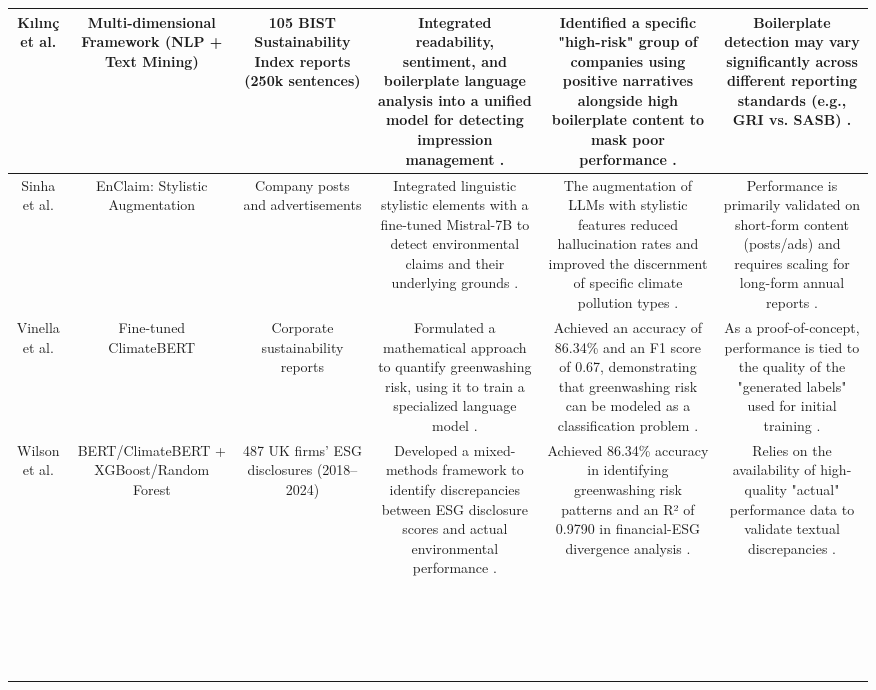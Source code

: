 \documentclass{article}
\begin{document}
\begin{table}[h!]
\begin{tabular}{|c|c|c|c|c|c|}
Kılınç et al.  \parencite{yavuz_k_l_n__64e32f80} & Multi-dimensional Framework (NLP + Text Mining) & 105 BIST Sustainability Index reports (250k sentences)  \parencite{yavuz_k_l_n__64e32f80} & Integrated readability, sentiment, and boilerplate language analysis into a unified model for detecting impression management  \parencite{yavuz_k_l_n__64e32f80}. & Identified a specific "high-risk" group of companies using positive narratives alongside high boilerplate content to mask poor performance  \parencite{yavuz_k_l_n__64e32f80}. & Boilerplate detection may vary significantly across different reporting standards (e.g., GRI vs. SASB)  \parencite{yavuz_k_l_n__64e32f80}. \\ \hline
Sinha et al.  \parencite{manjira_sinha_0b627b09} & EnClaim: Stylistic Augmentation & Company posts and advertisements  \parencite{manjira_sinha_0b627b09} & Integrated linguistic stylistic elements with a fine-tuned Mistral-7B to detect environmental claims and their underlying grounds  \parencite{manjira_sinha_0b627b09}. & The augmentation of LLMs with stylistic features reduced hallucination rates and improved the discernment of specific climate pollution types  \parencite{manjira_sinha_0b627b09}. & Performance is primarily validated on short-form content (posts/ads) and requires scaling for long-form annual reports  \parencite{manjira_sinha_0b627b09}. \\ \hline
Vinella et al.  \parencite{avalon_vinella_2bac2d88} & Fine-tuned ClimateBERT & Corporate sustainability reports  \parencite{avalon_vinella_2bac2d88} & Formulated a mathematical approach to quantify greenwashing risk, using it to train a specialized language model  \parencite{avalon_vinella_2bac2d88}. & Achieved an accuracy of 86.34\% and an F1 score of 0.67, demonstrating that greenwashing risk can be modeled as a classification problem  \parencite{avalon_vinella_2bac2d88}. & As a proof-of-concept, performance is tied to the quality of the "generated labels" used for initial training  \parencite{avalon_vinella_2bac2d88}. \\ \hline
Wilson et al.  \parencite{bernard_wilson_19498875} & BERT/ClimateBERT + XGBoost/Random Forest & 487 UK firms' ESG disclosures (2018–2024)  \parencite{bernard_wilson_19498875} & Developed a mixed-methods framework to identify discrepancies between ESG disclosure scores and actual environmental performance  \parencite{bernard_wilson_19498875}. & Achieved 86.34\% accuracy in identifying greenwashing risk patterns and an R² of 0.9790 in financial-ESG divergence analysis  \parencite{bernard_wilson_19498875}. & Relies on the availability of high-quality "actual" performance data to validate textual discrepancies  \parencite{bernard_wilson_19498875}. \\ \hline
~ & ~ & ~ & ~ & ~ & ~ \\ \hline
~ & ~ & ~ & ~ & ~ & ~ \\ \hline
~ & ~ & ~ & ~ & ~ & ~ \\ \hline
~ & ~ & ~ & ~ & ~ & ~ \\ \hline
\end{tabular}
\end{table}
\end{document}
